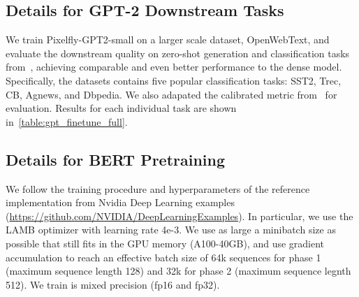 \subsection{Details for GPT-2 Downstream Tasks}
We train Pixelfly-GPT2-small on a larger scale dataset, OpenWebText, and evaluate the downstream quality on zero-shot generation and classification tasks from~\citep{zhao2021calibrate}, achieving comparable and even better performance to the dense model. Specifically, the datasets contains five popular classification tasks: SST2, Trec, CB, Agnews, and Dbpedia. We also adapated the calibrated metric from~\citep{zhao2021calibrate} for evaluation. Results for each individual task are shown in~\cref{table:gpt_finetune_full}. 

\begin{table}[h]
  \small
  \centering
  \vspace{-3mm}
  \caption{\label{table:gpt_finetune_full}The performance (accuracy) of GPT-2-medium trained with Monarch reverse sparsification and with conventional dense training on text classification benchmarks.}
  \setlength{\tabcolsep}{5pt}
  \vspace{1em}
  \vspace{-3mm}
\end{table}

\subsection{Details for BERT Pretraining}
\label{subsec:bert_details}

We follow the training procedure and hyperparameters of the reference
implementation from Nvidia Deep Learning examples
(\url{https://github.com/NVIDIA/DeepLearningExamples}).
In particular, we use the LAMB optimizer with learning rate 4e-3.
We use as large a minibatch size as possible that still fits in the GPU memory
(A100-40GB), and use gradient accumulation to reach an effective batch size of
64k sequences for phase 1 (maximum sequence length 128) and 32k for phase 2
(maximum sequence legnth 512).
We train is mixed precision (fp16 and fp32).

